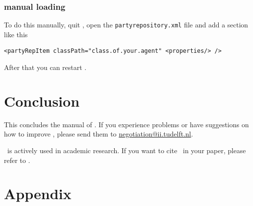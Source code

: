 \documentclass[]{article}
\begin{document}
\subsubsection{manual loading}
To do this manually, quit \Genius , open the \verb|partyrepository.xml| file and add a section like this

\begin{lstlisting}
<partyRepItem classPath="class.of.your.agent" <properties/> />
\end{lstlisting}

After that you can restart \Genius .

\section{Conclusion}
This concludes the manual of \Genius. If you experience problems or have suggestions on how to improve \Genius, please send them to \url{negotiation@ii.tudelft.nl}. 

\Genius\ is actively used in academic research. If you want to cite \Genius\ in your paper, please refer to \cite{Genius}.


\newpage
\section{Appendix}
\label{sec:appendix}
\end{document}
